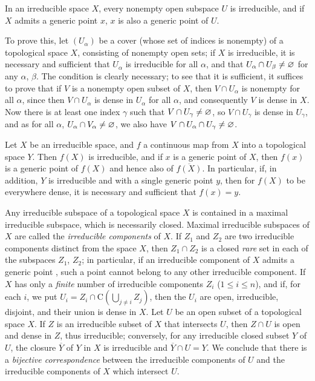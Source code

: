 \begin{env}[2.1.4]
\label{0.2.1.4}
In an irreducible space $X$, every nonempty open subspace $U$ is irreducible, and if $X$ admits a generic point $x$, $x$ is also a generic point of $U$.

To prove this, let $(U_\alpha)$ be a cover (whose set of indices is nonempty) of a topological space $X$, consisting of nonempty open sets; if $X$ is irreducible, it is necessary and sufficient that $U_\alpha$ is irreducible for all $\alpha$, and that $U_\alpha\cap U_\beta\neq\varnothing$ for any $\alpha$, $\beta$.
The condition is clearly necessary; to see that it is sufficient, it suffices to prove that if $V$ is a nonempty open subset of $X$, then $V\cap U_\alpha$ is nonempty for all $\alpha$, since then $V\cap U_\alpha$ is dense in $U_\alpha$ for all $\alpha$, and consequently $V$ is dense in $X$.
Now there is at least one index $\gamma$ such that $V\cap U_\gamma\neq\varnothing$, so $V\cap U_\gamma$ is dense in $U_\gamma$, and as for all $\alpha$, $U_\alpha\cap V_\alpha\neq\varnothing$, we also have $V\cap U_\alpha\cap U_\gamma\neq\varnothing$.
\end{env}

\begin{env}[2.1.5]
\label{0.2.1.5}
Let $X$ be an irreducible space, and $f$ a continuous map from $X$ into a topological space $Y$.
Then $f(X)$ is irreducible, and if $x$ is a generic point of $X$, then $f(x)$ is a generic point of $f(X)$ and hence also of $\overline{f(X)}$. 
In particular, if, in addition, $Y$ is irreducible and with a single generic point $y$, then for $f(X)$ to be everywhere dense, it is necessary and sufficient that $f(x)=y$.
\end{env}

\begin{env}[2.1.6]
\label{0.2.1.6}
Any irreducible subspace of a topological space $X$ is contained in a maximal irreducible subspace, which is necessarily closed.
Maximal irreducible subspaces of $X$ are called the \emph{irreducible components} of $X$.
If $Z_1$ and $Z_2$ are two irreducible components distinct from the space $X$, then $Z_1\cap Z_2$ is a closed \emph{rare} set in each of the subspaces $Z_1$, $Z_2$; in particular, if an irreducible component of $X$ admits a generic point , such a point cannot belong to any other irreducible component.
If $X$ has only a \emph{finite} number of irreducible components $Z_i$ ($1\leqslant i\leqslant n$), and if, for each $i$, we put
$U_i=Z_i\cap\mathrm{C}(\bigcup_{j\neq i}Z_j)$, then the $U_i$ are open, irreducible, disjoint, and their union is dense in $X$.
Let $U$ be an open subset of a topological space $X$.
If $Z$ is an irreducible subset of $X$ that intersects $U$, then $Z\cap U$ is open and dense in $Z$, thus irreducible; conversely, for any irreducible closed subset $Y$ of $U$, the closure $\overline{Y}$ of $Y$ in $X$ is irreducible and $\overline{Y}\cap U=Y$.
We conclude that there is a \emph{bijective correspondence} between the irreducible components of $U$ and the irreducible components of $X$ which intersect $U$.
\end{env}

